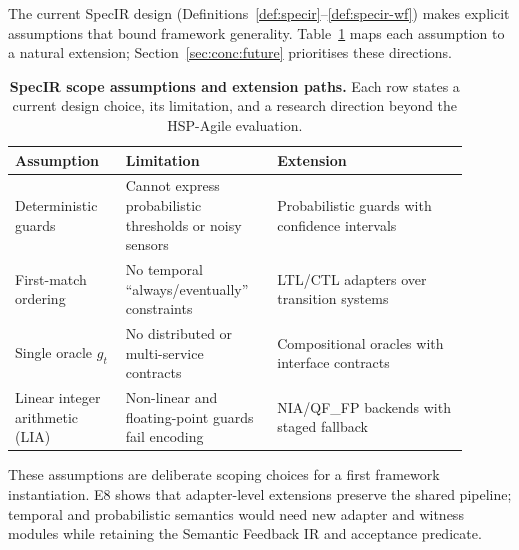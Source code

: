 The current SpecIR design (Definitions~\ref{def:specir}--\ref{def:specir-wf})
makes explicit assumptions that bound framework generality.
Table~\ref{tab:specir-scope} maps each assumption to a natural extension;
Section~\ref{sec:conc:future} prioritises these directions.

\begin{table}[t]
  \centering
  \caption{\textbf{SpecIR scope assumptions and extension paths.}
    Each row states a current design choice, its limitation, and a research
    direction beyond the HSP-Agile evaluation.}
  \label{tab:specir-scope}
  \footnotesize
  \renewcommand{\arraystretch}{1.15}
  \begin{tabular}{@{}p{0.22\linewidth}p{0.30\linewidth}p{0.38\linewidth}@{}}
    \toprule
    \textbf{Assumption} & \textbf{Limitation} & \textbf{Extension} \\
    \midrule
    Deterministic guards &
    Cannot express probabilistic thresholds or noisy sensors &
    Probabilistic guards with confidence intervals \\
    First-match ordering &
    No temporal ``always/eventually'' constraints &
    LTL/CTL adapters over transition systems \\
    Single oracle $g_t$ &
    No distributed or multi-service contracts &
    Compositional oracles with interface contracts \\
    Linear integer arithmetic (LIA) &
    Non-linear and floating-point guards fail encoding &
    NIA/QF\_FP backends with staged fallback \\
    \bottomrule
  \end{tabular}
\end{table}

These assumptions are deliberate scoping choices for a first framework
instantiation.
E8 shows that adapter-level extensions preserve the shared pipeline; temporal
and probabilistic semantics would need new adapter and witness modules while
retaining the Semantic Feedback IR and acceptance predicate.


